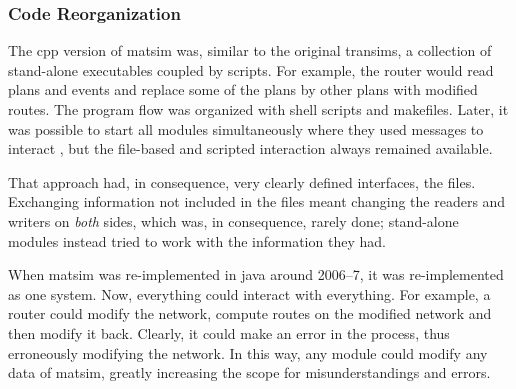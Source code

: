 

%


\subsubsection{Code Reorganization}
\label{sec:matsim-core-reorg}
The \gls{cpp} version of \gls{matsim} was, similar to the original \gls{transims}, a collection of stand-alone executables coupled by scripts.  For example, the router would read plans and events and replace some of the plans by other plans with modified routes.  The program flow was organized with shell scripts and makefiles.  Later, it was possible to start all modules simultaneously where they used messages to interact \citep[also see][]{GloorNagel2005ped-att04-birkh}, but the file-based and scripted interaction always remained available.

That approach had, in consequence, very clearly defined interfaces, \ie the files. Exchanging information not included in the files meant changing the readers and writers on \emph{both} sides, which was, in consequence, rarely done; stand-alone modules instead tried to work with the information they had.

When \gls{matsim} was re-implemented in \gls{java} around 2006--7, it was re-implemented as one system. Now, everything could interact with everything.  For example, a router could modify the network, compute routes on the modified network and then modify it back. Clearly, it could make an error in the process, thus erroneously modifying the network. In this way, any module could modify any data of \gls{matsim}, greatly increasing the scope for misunderstandings and errors.

